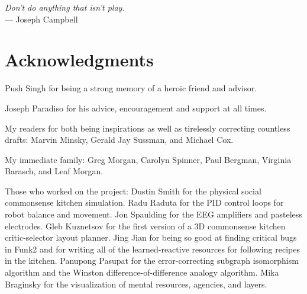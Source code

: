 



\begin{flushright}{\slshape    
Don't do anything that isn't play.} \\ \medskip
    --- Joseph Campbell
\end{flushright}



\bigskip

\begingroup
\let\clearpage\relax
\let\cleardoublepage\relax
\let\cleardoublepage\relax
\chapter*{Acknowledgments}

Push Singh for being a strong memory of a heroic friend and advisor.

\vspace{5mm}

\noindent Joseph Paradiso for his advice, encouragement and support at all times.

\vspace{5mm}

\noindent My readers for both being inspirations as well as tirelessly correcting countless drafts:
Marvin Minsky,
Gerald Jay Sussman, and
Michael Cox.

\vspace{5mm}

\noindent My immediate family:
Greg Morgan, Carolyn Spinner, Paul Bergman, Virginia Barasch, and Leaf Morgan.

\vspace{5mm}

\noindent Those who worked on the project:
Dustin Smith for the physical social commonsense kitchen simulation.
Radu Raduta for the PID control loops for robot balance and movement.
Jon Spaulding for the EEG amplifiers and pasteless electrodes.
Gleb Kuznetsov for the first version of a 3D commonsense kitchen critic-selector layout planner.
Jing Jian for being so good at finding critical bugs in Funk2 and for writing all of the learned-reactive resources for following recipes in the kitchen.
Panupong Pasupat for the error-correcting subgraph isomorphism algorithm and the Winston difference-of-difference analogy algorithm.
Mika Braginsky for the visualization of mental resources, agencies, and layers.

